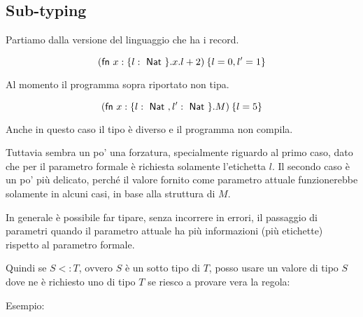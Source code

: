 

\subsection{Sub-typing}

Partiamo dalla versione del linguaggio che ha i record.

$$
(\fn x : \{ l : \Nat \} . x.l + 2 ) \: \{l=0, l' = 1\}
$$

\noindent Al momento il programma sopra riportato non tipa.

$$
(\fn x : \{ l : \Nat, l': \Nat \} . M ) \: \{ l = 5 \}
$$

\noindent Anche in questo caso il tipo è diverso e il programma non compila.

Tuttavia sembra un po' una forzatura, specialmente riguardo al primo caso, dato che per il parametro formale è richiesta solamente l'etichetta $l$.
Il secondo caso è un po' più delicato, perché il valore fornito come parametro attuale funzionerebbe solamente in alcuni casi, in base alla struttura di $M$.

In generale è possibile far tipare, senza incorrere in errori, il passaggio di parametri quando il parametro attuale ha più informazioni (più etichette) rispetto al parametro formale.

Quindi se $S <: T$, ovvero $S$ è un sotto tipo di $T$, posso usare un valore di tipo $S$ dove ne è richiesto uno di tipo $T$ se riesco a provare vera la regola:

\begin{prooftree}
\end{prooftree}

\noindent Esempio:

